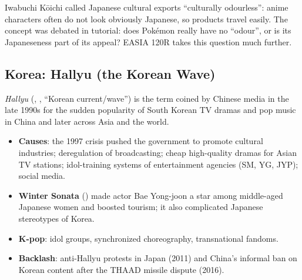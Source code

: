 \begin{aside}
Iwabuchi Kōichi called Japanese cultural exports ``culturally odourless'': anime characters
often do not look obviously Japanese, so products travel easily. The concept was debated in
tutorial: does Pokémon really have no ``odour'', or is its Japaneseness part of its appeal?
EASIA 120R takes this question much further.
\end{aside}

\subsection{Korea: Hallyu (the Korean Wave)}

\begin{definition}[Hallyu]
\emph{Hallyu} (, , ``Korean current/wave'') is the term coined by Chinese
media in the late 1990s for the sudden popularity of South Korean TV dramas and pop music
in China and later across Asia and the world.
\end{definition}

\begin{center}
\end{center}

\begin{itemize}
  \item \textbf{Causes}: the 1997 crisis pushed the government to promote cultural
        industries; deregulation of broadcasting; cheap high-quality dramas for Asian TV
        stations; idol-training systems of entertainment agencies (SM, YG, JYP); social
        media.
  \item \textbf{Winter Sonata} () made actor Bae Yong-joon a star among middle-aged
        Japanese women and boosted tourism; it also complicated Japanese stereotypes of
        Korea.
  \item \textbf{K-pop}: idol groups, synchronized choreography, transnational fandoms.
  \item \textbf{Backlash}: anti-Hallyu protests in Japan (2011) and China's informal ban on
        Korean content after the THAAD missile dispute (2016).
\end{itemize}

